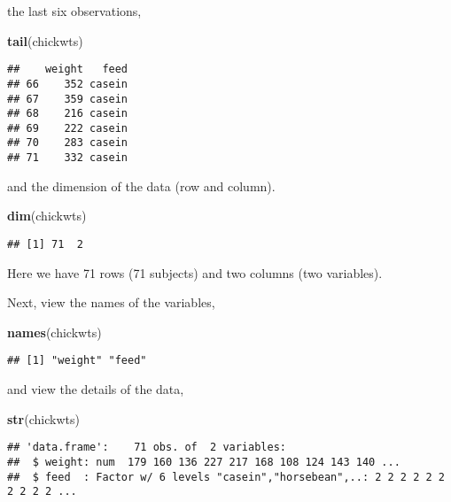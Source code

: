 \documentclass[]{book}
\newenvironment{Shaded}{\begin{snugshade}}{\end{snugshade}}
\newcommand{\KeywordTok}[1]{\textcolor[rgb]{0.13,0.29,0.53}{\textbf{#1}}}
\newcommand{\NormalTok}[1]{#1}
\theoremstyle{definition}
\theoremstyle{definition}
\theoremstyle{remark}
\begin{document}
the last six observations,

\begin{Shaded}
\begin{Highlighting}[]
\KeywordTok{tail}\NormalTok{(chickwts)}
\end{Highlighting}
\end{Shaded}

\begin{verbatim}
##    weight   feed
## 66    352 casein
## 67    359 casein
## 68    216 casein
## 69    222 casein
## 70    283 casein
## 71    332 casein
\end{verbatim}

and the dimension of the data (row and column).

\begin{Shaded}
\begin{Highlighting}[]
\KeywordTok{dim}\NormalTok{(chickwts)}
\end{Highlighting}
\end{Shaded}

\begin{verbatim}
## [1] 71  2
\end{verbatim}

Here we have 71 rows (71 subjects) and two columns (two variables).

Next, view the names of the variables,

\begin{Shaded}
\begin{Highlighting}[]
\KeywordTok{names}\NormalTok{(chickwts)}
\end{Highlighting}
\end{Shaded}

\begin{verbatim}
## [1] "weight" "feed"
\end{verbatim}

and view the details of the data,

\begin{Shaded}
\begin{Highlighting}[]
\KeywordTok{str}\NormalTok{(chickwts)}
\end{Highlighting}
\end{Shaded}

\begin{verbatim}
## 'data.frame':    71 obs. of  2 variables:
##  $ weight: num  179 160 136 227 217 168 108 124 143 140 ...
##  $ feed  : Factor w/ 6 levels "casein","horsebean",..: 2 2 2 2 2 2 2 2 2 2 ...
\end{verbatim}
\end{document}
